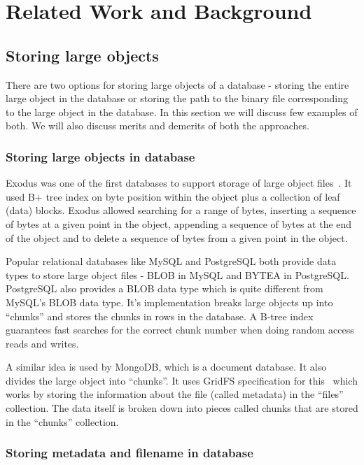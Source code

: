 \chapter{Related Work and Background}
\label{chap:relatedwork}

\section{Storing large objects}

There are two options for storing large objects of a database - storing the entire large object in the database or storing the path to the binary file corresponding to the large object in the database. In this section we will discuss few examples of both. We will also discuss merits and demerits of both the approaches.

\subsection{Storing large objects in database}

Exodus was one of the first databases to support storage of large object files~\cite{carey1986object}. It used B+ tree index on byte position within the object plus a collection of leaf (data) blocks. Exodus allowed searching for a range of bytes, inserting a sequence of bytes at a given point in the object, appending a sequence of bytes at the end of the object and to delete a sequence of bytes from a given point in the object.

Popular relational databases like MySQL and PostgreSQL both provide data types to store large object files - BLOB in MySQL and BYTEA in PostgreSQL.
PostgreSQL also provides a BLOB data type which is quite different from MySQL's BLOB data type. It's implementation breaks large objects up into ``chunks'' and stores the chunks in rows in the database. A B-tree index guarantees fast searches for the correct chunk number when doing random access reads and writes.

A similar idea is used by MongoDB, which is a document database. It also divides the large object into ``chunks''. It uses GridFS specification for this~\cite{hows2014gridfs} which works by storing the information about the file (called metadata) in the ``files'' collection. The data itself is broken down into pieces called chunks that are stored in the ``chunks'' collection.

\subsection{Storing metadata and filename in database}

